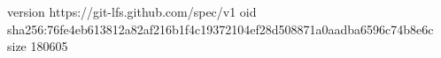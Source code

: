 version https://git-lfs.github.com/spec/v1
oid sha256:76fe4eb613812a82af216b1f4c19372104ef28d508871a0aadba6596c74b8e6c
size 180605
